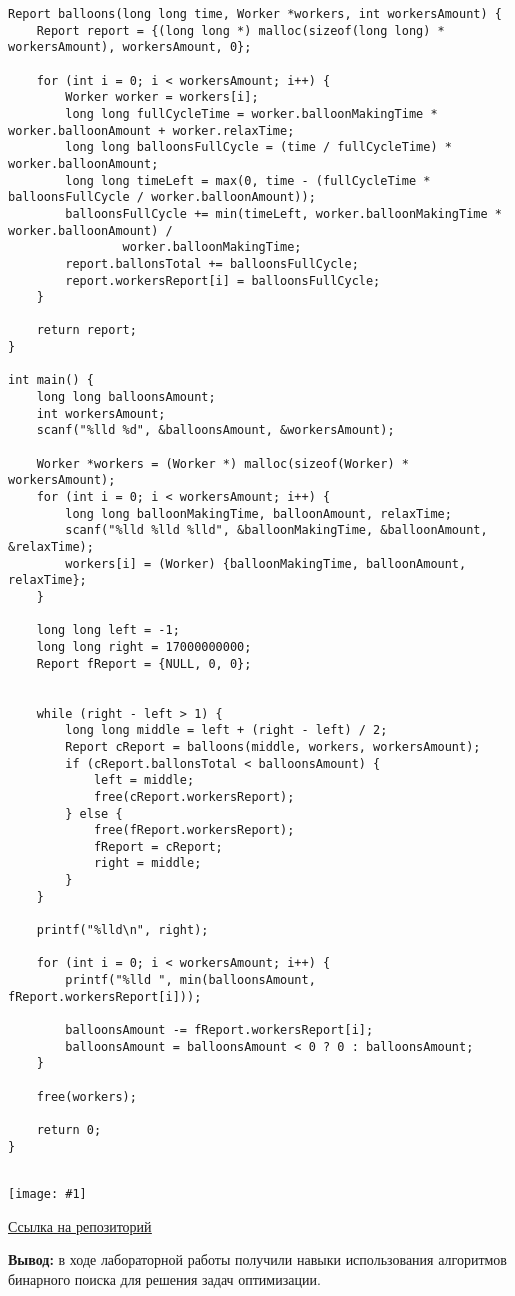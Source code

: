 \documentclass[a4paper,14pt]{extarticle}
\newcommand\codeforcesresult[1]{
    \begin{center}
        \texttt{[image: \#1]}
    \end{center}
}
\begin{document}
\begin{enumerate}
\begin{verbatim}
Report balloons(long long time, Worker *workers, int workersAmount) {
    Report report = {(long long *) malloc(sizeof(long long) * workersAmount), workersAmount, 0};

    for (int i = 0; i < workersAmount; i++) {
        Worker worker = workers[i];
        long long fullCycleTime = worker.balloonMakingTime * worker.balloonAmount + worker.relaxTime;
        long long balloonsFullCycle = (time / fullCycleTime) * worker.balloonAmount;
        long long timeLeft = max(0, time - (fullCycleTime * balloonsFullCycle / worker.balloonAmount));
        balloonsFullCycle += min(timeLeft, worker.balloonMakingTime * worker.balloonAmount) /
                worker.balloonMakingTime;
        report.ballonsTotal += balloonsFullCycle;
        report.workersReport[i] = balloonsFullCycle;
    }

    return report;
}

int main() {
    long long balloonsAmount;
    int workersAmount;
    scanf("%lld %d", &balloonsAmount, &workersAmount);

    Worker *workers = (Worker *) malloc(sizeof(Worker) * workersAmount);
    for (int i = 0; i < workersAmount; i++) {
        long long balloonMakingTime, balloonAmount, relaxTime;
        scanf("%lld %lld %lld", &balloonMakingTime, &balloonAmount, &relaxTime);
        workers[i] = (Worker) {balloonMakingTime, balloonAmount, relaxTime};
    }

    long long left = -1;
    long long right = 17000000000;
    Report fReport = {NULL, 0, 0};


    while (right - left > 1) {
        long long middle = left + (right - left) / 2;
        Report cReport = balloons(middle, workers, workersAmount);
        if (cReport.ballonsTotal < balloonsAmount) {
            left = middle;
            free(cReport.workersReport);
        } else {
            free(fReport.workersReport);
            fReport = cReport;
            right = middle;
        }
    }

    printf("%lld\n", right);

    for (int i = 0; i < workersAmount; i++) {
        printf("%lld ", min(balloonsAmount, fReport.workersReport[i]));

        balloonsAmount -= fReport.workersReport[i];
        balloonsAmount = balloonsAmount < 0 ? 0 : balloonsAmount;
    }

    free(workers);

    return 0;
}


\end{verbatim}
\codeforcesresult{/codeforceresults/283932D}
\href{https://github.com/IAmProgrammist/programming-and-algorithmization-basics/blob/c/lab10/19.c}{\underline{Ссылка на репозиторий}}

\newpage

\end{enumerate}
\textbf{Вывод: }
в ходе лабораторной работы получили навыки использования алгоритмов бинарного поиска для решения задач оптимизации.


\end{document}
